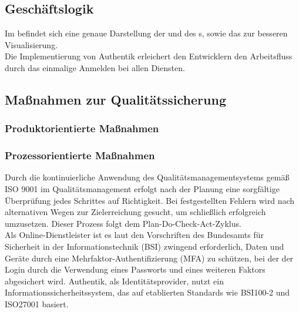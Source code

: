 \subsection{Geschäftslogik}
\label{sec:Geschaeftslogik}
Im  befindet sich eine genaue Darstellung der  und des s, 
sowie das  zur besseren Visualisierung. 
\\Die Implementierung von Authentik erleichert den Entwicklern den Arbeitsfluss durch das einmalige Anmelden bei allen Diensten.

\subsection{Maßnahmen zur Qualitätssicherung}
\label{sec:Qualitaetssicherung}

\subsubsection{Produktorientierte Maßnahmen}
\label{sec:ProduktorientierteMaßnahmen}

\subsubsection{Prozessorientierte Maßnahmen}
\label{sec:ProzessorientierteMaßnahmen}
Durch die kontinuierliche Anwendung des Qualitätsmanagementsystems gemäß ISO 9001 im Qualitätsmanagement erfolgt nach der Planung 
eine sorgfältige Überprüfung jedes Schrittes auf Richtigkeit. Bei festgestellten Fehlern wird nach alternativen Wegen zur 
Zielerreichung gesucht, um schließlich erfolgreich umzusetzen. Dieser Prozess folgt dem Plan-Do-Check-Act-Zyklus.
\\Als Online-Dienstleister ist es laut den Vorschriften des Bundesamts für Sicherheit in der Informationstechnik (BSI) 
zwingend erforderlich, Daten und Geräte durch eine Mehrfaktor-Authentifizierung (\acs{MFA}) zu schützen, bei der der Login durch 
die Verwendung eines Passworts und eines weiteren Faktors abgesichert wird. Authentik, als Identitätsprovider, nutzt ein 
Informationssicherheitssystem, das auf etablierten Standards wie BSI100-2 und ISO27001 basiert.